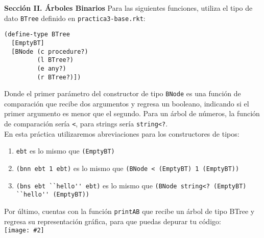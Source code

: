 \documentclass{article}
\newcommand{\jimage}[2]{\texttt{[image: \#2]}\vskip10pt}
\begin{document}
\textbf{Sección II. Árboles Binarios}
Para las siguientes funciones, utiliza el tipo de dato \verb;BTree;
definido en \verb;practica3-base.rkt;:
\begin{verbatim}
(define-type BTree
  [EmptyBT]
  [BNode (c procedure?)
         (l BTree?)
         (e any?)
         (r BTree?)])
\end{verbatim}

Donde el primer parámetro del constructor de tipo \verb;BNode; es una función de comparación que recibe dos argumentos y regresa un booleano, indicando si el primer argumento es menor que el segundo. Para un árbol de números, la función de comparación sería \verb;<;, para strings sería \verb;string<?;. \\
    
En esta práctica utilizaremos abreviaciones para los constructores de tipos:

\begin{enumerate}
\item \verb;ebt; es lo mismo que \verb;(EmptyBT);
\item \verb;(bnn ebt 1 ebt); es lo mismo que \verb;(BNode < (EmptyBT) 1 (EmptyBT));
\item \verb;(bns ebt ``hello'' ebt); es lo mismo que \verb;(BNode string<? (EmptyBT) ``hello'' (EmptyBT));
\end{enumerate}

Por último, cuentas con la función \verb;printAB; que recibe un árbol de tipo BTree y regresa su representación gráfica, para que puedas depurar tu código: \\

\jimage{0.9}{imgs/printab1.png}
\end{document}

